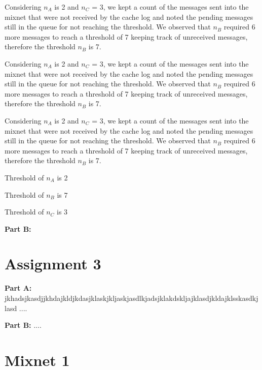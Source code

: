 \documentclass[preprint,12pt,3p]{elsarticle}
\begin{document}
\begin{flushleft}
\newline
Considering $n_A$ is 2 and $n_C$ = 3, we kept a count of the messages sent into the mixnet that were not received by the cache log and noted the pending messages still in the queue for not reaching the threshold. We observed that $n_B$ required 6 more messages to reach a threshold of 7 keeping  track of unreceived messages, therefore the threshold $n_B$ is 7. 

\newline
Considering $n_A$ is 2 and $n_C$ = 3, we kept a count of the messages sent into the mixnet that were not received by the cache log and noted the pending messages still in the queue for not reaching the threshold. We observed that $n_B$ required 6 more messages to reach a threshold of 7 keeping  track of unreceived messages, therefore the threshold $n_B$ is 7. 

\newline
Considering $n_A$ is 2 and $n_C$ = 3, we kept a count of the messages sent into the mixnet that were not received by the cache log and noted the pending messages still in the queue for not reaching the threshold. We observed that $n_B$ required 6 more messages to reach a threshold of 7 keeping  track of unreceived messages, therefore the threshold $n_B$ is 7. 

\begin{center}
Threshold of $n_A$ is 2

Threshold of $n_B$ is 7

Threshold of $n_C$ is 3
\end{center}




\textbf{Part B:}

\section*{Assignment 3}
\textbf{Part A:}
jkhadsjkasdjjkhdajkldjkdasjklaskjkljaskjasdlkjadsjklakdskljajklasdjkldajklsskasdkjlasd
....
\newline


\textbf{Part B:}
....
\newline

\end{flushleft}

\appendix

\section{Mixnet 1}
\end{document}
